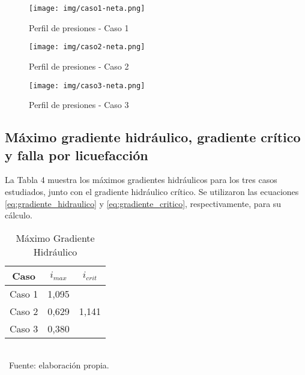 \documentclass{article} %
\begin{document}
\begin{figure}[h!]
    \centering
    \begin{minipage}{0.5\textwidth}
        \centering
        \texttt{[image: img/caso1-neta.png]}
        \caption{Perfil de presiones - Caso 1}
        \label{fig:imagen7}
    \end{minipage}\hfill
    \begin{minipage}{0.5\textwidth}
        \centering
        \texttt{[image: img/caso2-neta.png]}
        \caption{Perfil de presiones - Caso 2}
        \label{fig:imagen8}
    \end{minipage}\hfill
\end{figure}

\begin{figure}[h!]
    \centering
    \begin{minipage}{0.5\textwidth}
        \centering
        \texttt{[image: img/caso3-neta.png]}
        \caption{Perfil de presiones - Caso 3}
        \label{fig:imagen9}
    \end{minipage}
\end{figure}

\vspace{3cm}

\subsection{Máximo gradiente hidráulico, gradiente crítico y falla por licuefacción}

La Tabla 4 muestra los máximos gradientes hidráulicos para los tres casos estudiados, junto con el gradiente hidráulico crítico. Se utilizaron las ecuaciones \ref{eq:gradiente_hidraulico} y \ref{eq:gradiente_critico}, respectivamente, para su cálculo.

\begin{table}[h!]
    \centering
    \caption{Máximo Gradiente Hidráulico}
    \begin{tabular}{|c|c|c|}
      \hline
      Caso & $i_{max}$ & \multicolumn{1}{c|}{$i_{crit}$} \\ %
      \hline
      Caso 1 & 1,095 & \multirow{3}{*}{1,141} \\ %
      Caso 2 & 0,629 &  \\ %
      Caso 3 & 0,380 &  \\ %
      \hline
    \end{tabular}
    \footnotesize \\\ Fuente: elaboración propia.
    \label{tab4}
\end{table}
\end{document}
